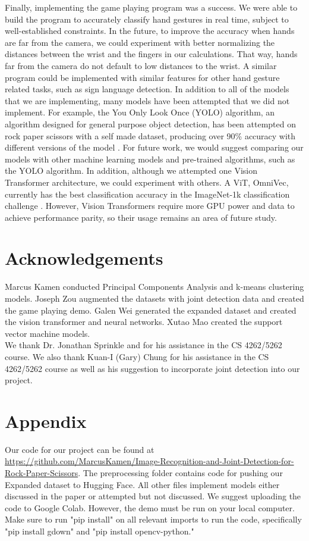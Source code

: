 \documentclass{article}
\begin{document}
Finally, implementing the game playing program was a success. We were able to build the program to accurately classify hand gestures in real time, subject to well-established constraints. In the future, to improve the accuracy when hands are far from the camera, we could experiment with better normalizing the distances between the wrist and the fingers in our calculations. That way, hands far from the camera do not default to low distances to the wrist. A similar program could be implemented with similar features for other hand gesture related tasks, such as sign language detection.
In addition to all of the models that we are implementing, many models have been attempted that we did not implement. For example, the You Only Look Once (YOLO) algorithm, an algorithm designed for general purpose object detection, has been attempted on rock paper scissors with a self made dataset, producing over 90\% accuracy with different versions of the model \cite{yolo}. For future work, we would suggest comparing our models with other machine learning models and pre-trained algorithms, such as the YOLO algorithm. In addition, although we attempted one Vision Transformer architecture, we could experiment with others. A ViT, OmniVec, currently has the best classification accuracy in the ImageNet-1k classification challenge \cite{imagenet}. However, Vision Transformers require more GPU power and data to achieve performance parity, so their usage remains an area of future study.

\section{Acknowledgements}
Marcus Kamen conducted Principal Components Analysis and k-means clustering models. Joseph Zou augmented the datasets with joint detection data and created the game playing demo. Galen Wei generated the expanded dataset and created the vision transformer and neural networks. Xutao Mao created the support vector machine models. \\
We thank Dr. Jonathan Sprinkle and for his assistance in the CS 4262/5262 course. We also thank Kuan-I (Gary) Chung for his assistance in the CS 4262/5262 course as well as his suggestion to incorporate joint detection into our project.

\section{Appendix}
Our code for our project can be found at \url{https://github.com/MarcusKamen/Image-Recognition-and-Joint-Detection-for-Rock-Paper-Scissors}. The preprocessing folder contains code for pushing our Expanded dataset to Hugging Face. All other files implement models either discussed in the paper or attempted but not discussed. We suggest uploading the code to Google Colab. However, the demo must be run on your local computer. Make sure to run "pip install" on all relevant imports to run the code, specifically "pip install gdown" and "pip install opencv-python."



\end{document}
